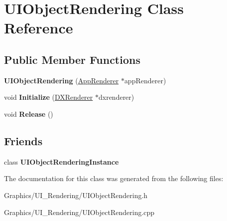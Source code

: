 \hypertarget{classUIObjectRendering}{}\section{U\+I\+Object\+Rendering Class Reference}
\label{classUIObjectRendering}
\subsection*{Public Member Functions}
\begin{DoxyCompactItemize}
\item 
\mbox{\label{classUIObjectRendering_ac3934f4cbfaa4bb0abeb0ea975942ee9}} 
{\bfseries U\+I\+Object\+Rendering} (\hyperlink{classAppRenderer}{App\+Renderer} $\ast$app\+Renderer)
\item 
\mbox{\label{classUIObjectRendering_a750cd734ce1568f527928482e11e856d}} 
void {\bfseries Initialize} (\hyperlink{classDXRenderer}{D\+X\+Renderer} $\ast$dxrenderer)
\item 
\mbox{\label{classUIObjectRendering_a8aa7d0af24eee067f807c3d91f3b521d}} 
void {\bfseries Release} ()
\end{DoxyCompactItemize}
\subsection*{Friends}
\begin{DoxyCompactItemize}
\item 
\mbox{\label{classUIObjectRendering_af8087aef5ebe8f9a42bfabe1e0672728}} 
class {\bfseries U\+I\+Object\+Rendering\+Instance}
\end{DoxyCompactItemize}


The documentation for this class was generated from the following files\+:\begin{DoxyCompactItemize}
\item 
Graphics/\+U\+I\+\_\+\+Rendering/U\+I\+Object\+Rendering.\+h\item 
Graphics/\+U\+I\+\_\+\+Rendering/U\+I\+Object\+Rendering.\+cpp\end{DoxyCompactItemize}
